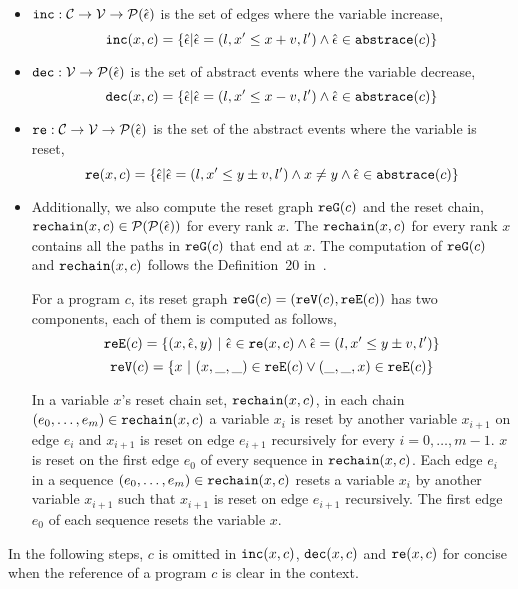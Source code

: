  \begin{itemize}
 \item
 $\mathtt{inc}: \mathcal{C} \to \mathcal{V} \to \mathcal{P}(\hat{\mathtt{\epsilon}{}}) $
 is the set of edges where the variable increase, 
 \[ \inc(x, c) = \left\{ \absevent | \absevent = (l, x' \leq x + v, l') \land \absevent \in \absflow(c) \right\} \]
 \item
 $\mathtt{dec}: \mathcal{V} \to \mathcal{P}(\hat{\mathtt{\epsilon}{}}) $
 is the set of abstract events where the variable decrease,
 \[\dec(x, c) = \left\{\absevent| \absevent = (l, x' \leq x - v, l') \land \absevent \in \absflow(c) \right\}\]
 \item
 $\mathtt{re}: \mathcal{C} \to \mathcal{V} \to \mathcal{P}(\hat{\mathtt{\epsilon}{}}) $ is the set of the abstract events where the variable is reset,
%
 \[\reset(x, c) = \left\{ \absevent| \absevent = (l, x' \leq y \pm v, l') \land x \neq y \land \absevent \in \absflow(c) \right\}\]
 \item
 Additionally,
 we also compute the reset graph $\mathtt{re{G}}(c)$ and the reset chain, $\mathtt{rechain}(x, c) \in \mathcal{P}(\mathcal{P}(\hat{\mathtt{\epsilon}{}}))$ for every rank $x$.
 The $\mathtt{rechain}(x, c)$ for every rank $x$ contains all the paths in $\mathtt{re{G}}(c)$ that end at $x$.
 The computation of $\mathtt{re{G}}(c)$ and $\mathtt{rechain}(x, c)$ follows the Definition~20 in~\cite{SinnZV17}.
 \begin{defn}
    \label{def:resetgraph}
    For a program $c$, its reset graph $\mathtt{re{G}}(c) = (\mathtt{re{V}}(c), \mathtt{re{E}}(c))$ has two components,
    each of them is computed as follows,
 \[
    \resetE(c) = \left\{ (x, \absevent, y) ~\vert~ \absevent \in \reset(x, c) \land \absevent = (l, x' \leq y \pm v, l') \right\} 
 \]
 \[
    \resetV(c) = \left\{ x ~\vert~ (x, \_, \_) \in \resetE(c) \lor (\_, \_, x) \in \resetE(c) \right\} 
    \]
 \end{defn}
 In a variable $x$'s reset chain set, $\mathtt{rechain}(x, c)$, in each chain $(e_0, \ldots, e_m) \in \mathtt{rechain}(x, c)$
 a variable $x_i$ is reset by another variable $x_{i + 1}$ on edge $e_{i}$
 and $x_{i + 1}$ is reset on edge $e_{i + 1}$ recursively
 for every $i = 0, \ldots, m - 1$.
 $x$ is reset on the first edge $e_0$ of every sequence in $\mathtt{rechain}(x, c)$.
 {Each edge $e_i$ in a sequence $(e_0, \ldots, e_m) \in \mathtt{rechain}(x, c)$
 resets a variable $x_i$ by another variable $x_{i + 1}$ such that $x_{i + 1}$
 is reset on edge $e_{i + 1}$ recursively. The first edge $e_0$ of each sequence resets the variable $x$.}
 \end{itemize}
 In the following steps, $c$ is omitted in $\mathtt{inc}(x, c)$,
 $\mathtt{dec}(x, c)$ and $\mathtt{re}(x, c)$ for concise when the reference of a program $c$ is clear in the context.

